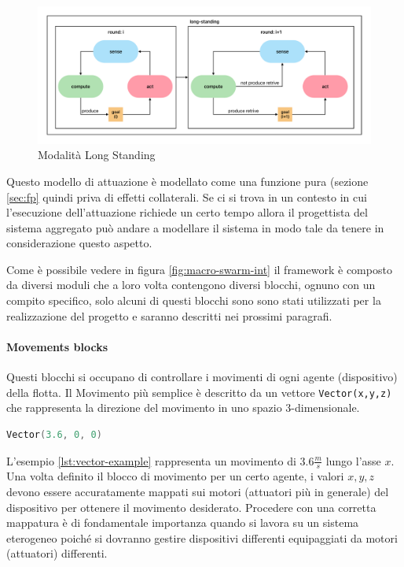 \documentclass[12pt,a4paper,openright,twoside]{book}
\begin{document}
\begin{figure}
    \centering
    \includegraphics[width=.99\linewidth]{figures/long-standing.pdf}
    \caption{Modalità Long Standing}
    \label{fig:long-standong}
\end{figure}

Questo modello di attuazione è modellato come una funzione pura (sezione \ref{sec:fp} quindi priva di effetti collaterali. Se ci si trova in un contesto in cui l'esecuzione dell'attuazione richiede un certo tempo allora il progettista del sistema aggregato può andare a modellare il sistema in modo tale da tenere in considerazione questo aspetto.

Come è possibile vedere in figura \ref{fig:macro-swarm-int} \cite{Macroswarm} il framework è composto da diversi moduli che a loro volta contengono diversi blocchi, ognuno con un compito specifico, solo alcuni di questi blocchi sono sono stati utilizzati per la realizzazione del progetto e saranno descritti nei prossimi paragrafi.

\paragraph{Movements blocks} 
Questi blocchi si occupano di controllare i movimenti di ogni agente (dispositivo) della flotta. Il Movimento più semplice è descritto da un vettore \verb|Vector(x,y,z)| che rappresenta la direzione del movimento in uno spazio 3-dimensionale. 

\begin{lstlisting}[language=Scala, label={lst:vector-example}]
    Vector(3.6, 0, 0)
\end{lstlisting}

L'esempio \ref{lst:vector-example} rappresenta un movimento di $3.6 \frac{m}{s}$ lungo l'asse $x$. Una volta definito il blocco di movimento per un certo agente, i valori $x,y,z$ devono essere accuratamente mappati sui motori (attuatori più in generale) del dispositivo per ottenere il movimento desiderato. Procedere con una corretta mappatura è di fondamentale importanza quando si lavora su un sistema eterogeneo poiché si dovranno gestire dispositivi differenti equipaggiati da motori (attuatori) differenti.
\end{document}
